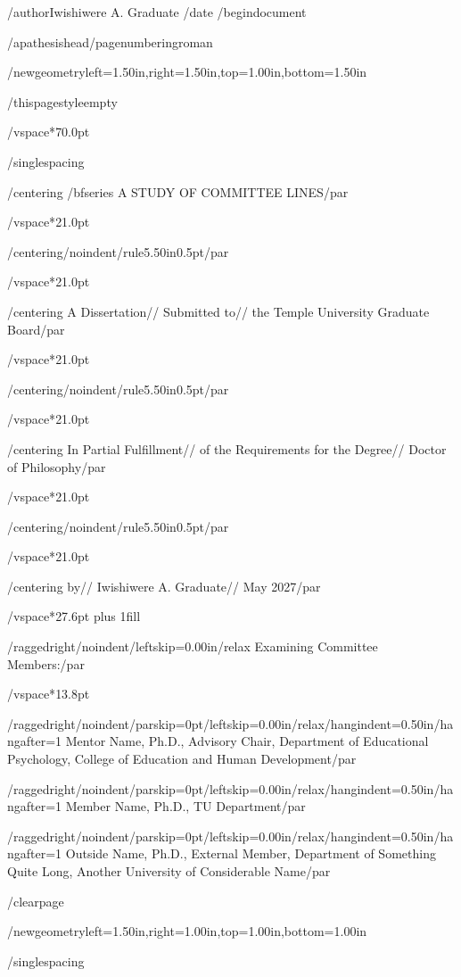 /author{Iwishiwere A. Graduate}
/date{}
/begin{document}


/apathesishead/pagenumbering{roman}

/newgeometry{left=1.50in,right=1.50in,top=1.00in,bottom=1.50in}

/thispagestyle{empty}

/vspace*{70.0pt}

/singlespacing

{/centering
/bfseries A STUDY OF COMMITTEE LINES/par}

/vspace*{21.0pt}

{/centering/noindent/rule{5.50in}{0.5pt}/par}

/vspace*{21.0pt}

{/centering
A Dissertation//
Submitted to//
the Temple University Graduate Board/par}

/vspace*{21.0pt}

{/centering/noindent/rule{5.50in}{0.5pt}/par}

/vspace*{21.0pt}

{/centering
In Partial Fulfillment//
of the Requirements for the Degree//
Doctor of Philosophy/par}

/vspace*{21.0pt}

{/centering/noindent/rule{5.50in}{0.5pt}/par}

/vspace*{21.0pt}

{/centering
by//
Iwishiwere A. Graduate//
May 2027/par}

/vspace*{27.6pt plus 1fill}

{/raggedright/noindent/leftskip=0.00in/relax
Examining Committee Members:/par}

/vspace*{13.8pt}

{/raggedright/noindent/parskip=0pt/leftskip=0.00in/relax/hangindent=0.50in/hangafter=1
Mentor Name, Ph.D., Advisory Chair,
Department of Educational Psychology, College of Education and Human Development/par}

{/raggedright/noindent/parskip=0pt/leftskip=0.00in/relax/hangindent=0.50in/hangafter=1
Member Name, Ph.D., TU Department/par}

{/raggedright/noindent/parskip=0pt/leftskip=0.00in/relax/hangindent=0.50in/hangafter=1
Outside Name, Ph.D., External Member,
Department of Something Quite Long, Another University of Considerable Name/par}

/clearpage

/newgeometry{left=1.50in,right=1.00in,top=1.00in,bottom=1.00in}

/singlespacing

